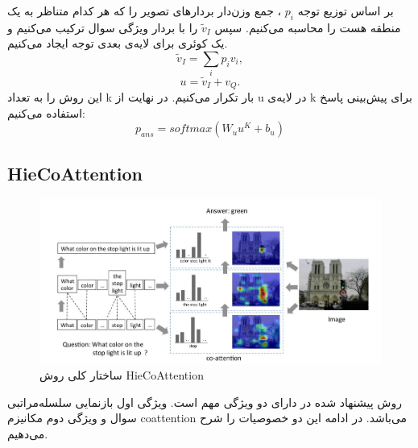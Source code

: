 {{{	    بر اساس توزیع توجه
	     $p_i$
	     ، جمع وزن‌دار بردارهای تصویر را که هر کدام متناظر به یک منطقه هست را محاسبه می‌کنیم. سپس
	     $\tilde{v}_I$
	      را با بردار ویژگی سوال ترکیب می‌کنیم و یک کوئری برای لایه‌ی بعدی توجه ایجاد می‌کنیم.	    
	     \begin{equation}
	      	\tilde{v}_I =\sum_i p_iv_i,
	     \end{equation}
	     \begin{equation}
	        u =\tilde{v}_I + v_Q.
	     \end{equation}
	      این روش را به تعداد k بار تکرار می‌کنیم. در نهایت از u در لایه‌ی k برای پیش‌بینی پاسخ استفاده می‌کنیم:
	     \begin{equation}
	     	p_{ans} =softmax(W_uu^K + b_u)
	     \end{equation}
	     
		}
	}

	\subsection{HieCoAttention}
	{
		\begin{figure}
			\centering
			\includegraphics[scale=0.6]{images/hiecoattention.JPG}
			\caption{ساختار کلی روش HieCoAttention}
			\label{fig:7}
		\end{figure}
		روش پیشنهاد شده در 
		\cite{}
		دارای دو ویژگی مهم است. ویژگی اول بازنمایی سلسله‌مراتبی سوال و ویژگی دوم مکانیزم coattention می‌باشد. در ادامه این دو خصوصیات را شرح می‌دهیم.
		
}}
